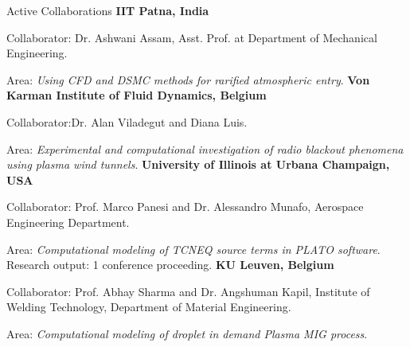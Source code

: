 \begin{rubric}{Active Collaborations}
\entry*[ ]%
    \textbf{IIT Patna, India}\par
	{Collaborator}: Dr. Ashwani Assam, Asst. Prof. at Department of Mechanical Engineering.\par
      {Area}: \emph{Using CFD and DSMC methods for rarified atmospheric entry}.%
\entry*[ ]%
    \textbf{Von Karman Institute of Fluid Dynamics, Belgium}\par
	{Collaborator}:Dr. Alan Viladegut and Diana Luis. \par
      {Area}: \emph{Experimental and computational investigation of radio blackout phenomena using plasma wind tunnels}.
\entry*[ ]%
    \textbf{University of Illinois at Urbana Champaign, USA}\par
	{Collaborator}: Prof. Marco Panesi and Dr. Alessandro Munafo, Aerospace Engineering Department. \par
      {Area}: \emph{Computational modeling of TCNEQ source terms in PLATO software}.
      {Research output}:  1 conference proceeding.
\entry*[ ]%
    \textbf{KU Leuven, Belgium}\par
	{Collaborator}: Prof. Abhay Sharma and Dr. Angshuman Kapil, Institute of Welding Technology, Department of Material Engineering. \par
      {Area}: \emph{Computational modeling of droplet in demand Plasma MIG process}.\par
\end{rubric}